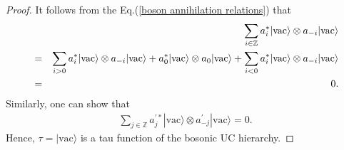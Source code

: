 \documentclass[10pt,a4paper]{amsart}
\numberwithin{equation}{section}
\begin{document}
\begin{proof}
It follows from the Eq.(\ref{boson annihilation relations}) that
\begin{eqnarray}
&&\sum\limits_{i\in\mathbb{Z}}a^{\ast}_{i}|\text{vac}\rangle\otimes a_{-i}|\text{vac}\rangle\notag\\
&=&\sum\limits_{i>0}a^{\ast}_{i}|\text{vac}\rangle\otimes a_{-i}|\text{vac}\rangle+a^{\ast}_{0}|\text{vac}\rangle\otimes a_{0}|\text{vac}\rangle+\sum\limits_{i<0}a^{\ast}_{i}|\text{vac}\rangle\otimes a_{-i}|\text{vac}\rangle\notag\\
&=&0.
\end{eqnarray}
Similarly, one can show that
\begin{eqnarray}
\sum\limits_{j\in\mathbb{Z}}a^{\prime\ast}_{j}|\text{vac}\rangle\otimes a^{\prime}_{-j}|\text{vac}\rangle=0.
\end{eqnarray}
Hence, $\tau=|\text{vac}\rangle$ is a tau function of the bosonic UC hierarchy.


\end{proof}
\end{document}
